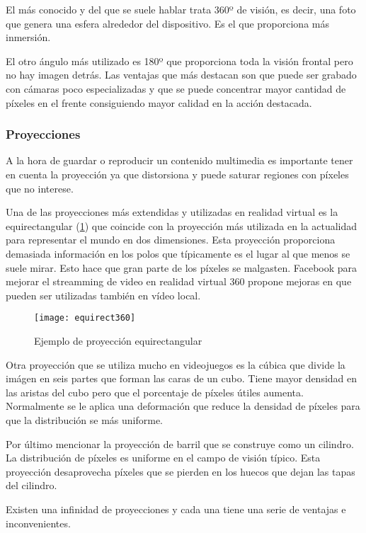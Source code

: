 El más conocido y del que se suele hablar trata 360º de visión, es decir, una foto que genera una esfera alrededor del dispositivo. Es el que proporciona más inmersión.

El otro ángulo más utilizado es 180º que proporciona toda la visión frontal pero no hay imagen detrás. Las ventajas que más destacan son que puede ser grabado con cámaras poco especializadas y que se puede concentrar mayor cantidad de píxeles en el frente consiguiendo mayor calidad en la acción destacada.


\subsubsection{Proyecciones}
A la hora de guardar o reproducir un contenido multimedia es importante tener en cuenta la proyección ya que distorsiona y puede saturar regiones con píxeles que no interese. 

Una de las proyecciones más extendidas y utilizadas en realidad virtual es la equirectangular (\ref{fig:equirect360-example}) que coincide con la proyección más utilizada en la actualidad para representar el mundo en dos dimensiones. Esta proyección proporciona demasiada información en los polos que típicamente es el lugar al que menos se suele mirar. Esto hace que gran parte de los píxeles se malgasten. Facebook para mejorar el streamming de video en realidad virtual 360 propone mejoras en \cite{FBDynamicStreamming} que pueden ser utilizadas también en vídeo local.

\begin{figure}[h]
  \centering
  \texttt{[image: equirect360]}
  \caption{Ejemplo de proyección equirectangular}
  \label{fig:equirect360-example}
\end{figure}

Otra proyección que se utiliza mucho en videojuegos es la cúbica que divide la imágen en seis partes que forman las caras de un cubo. Tiene mayor densidad en las aristas del cubo pero que el porcentaje de píxeles útiles aumenta. Normalmente se le aplica una deformación que reduce la densidad de píxeles para que la distribución se más uniforme.

Por último mencionar la proyección de barril que se construye como un cilindro. La distribución de píxeles es uniforme en el campo de visión típico. Esta proyección desaprovecha píxeles que se pierden en los huecos que dejan las tapas del cilindro.

Existen una infinidad de proyecciones y cada una tiene una serie de ventajas e inconvenientes.
 

